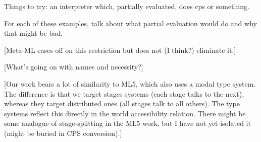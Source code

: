 Things to try: an interpreter which, partially evaluated, does cps or something.

For each of these examples, talk about what partial evaluation would do and why that might be bad.


[Meta-ML eases off on this restriction but does not (I think?) eliminate it.]

[What's going on with names and necessity?]

[Our work bears a lot of similarity to ML5, which also uses a modal type system.  The difference is that we target stages systems (each stage talks to the next), whereas they target distributed ones (all stages talk to all others). The type systems reflect this directly in the world accessibility relation.  There might be some analogue of stage-splitting in the ML5 work, but I have not yet isolated it (might be buried in CPS conversion).]


